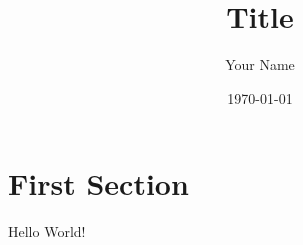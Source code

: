 \documentclass{article}
\title{Title}
\author{Your Name}
\date{\today}
\begin{document}
\maketitle

\section{First Section}

Hello World!
\end{document}
